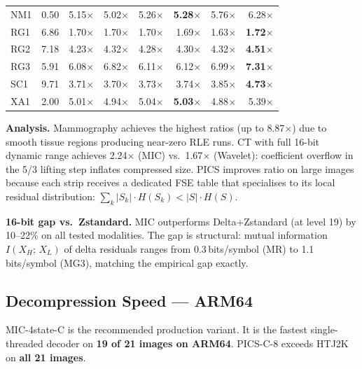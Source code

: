 \documentclass[journal]{IEEEtran}
\begin{document}
\begin{table}[t]
\begin{tabular}{lrrrrrrr}
NM1  & 0.50 & 5.15$\times$ & 5.02$\times$ & 5.26$\times$ & \textbf{5.28$\times$} & 5.76$\times$ & 6.28$\times$ \\
RG1  & 6.86 & 1.70$\times$ & 1.70$\times$ & 1.70$\times$ & 1.69$\times$ & 1.63$\times$ & \textbf{1.72$\times$} \\
RG2  & 7.18 & 4.23$\times$ & 4.32$\times$ & 4.28$\times$ & 4.30$\times$ & 4.32$\times$ & \textbf{4.51$\times$} \\
RG3  & 5.91 & 6.08$\times$ & 6.82$\times$ & 6.11$\times$ & 6.12$\times$ & 6.99$\times$ & \textbf{7.31$\times$} \\
SC1  & 9.71 & 3.71$\times$ & 3.70$\times$ & 3.73$\times$ & 3.74$\times$ & 3.85$\times$ & \textbf{4.73$\times$} \\
XA1  & 2.00 & 5.01$\times$ & 4.94$\times$ & 5.04$\times$ & \textbf{5.03$\times$} & 4.88$\times$ & 5.39$\times$ \\
\bottomrule
\end{tabular}
\end{table}

\textbf{Analysis.} Mammography achieves the highest ratios (up to 8.87$\times$)
due to smooth tissue regions producing near-zero RLE runs. CT with full 16-bit
dynamic range achieves 2.24$\times$ (MIC) vs.\ 1.67$\times$ (Wavelet): coefficient
overflow in the 5/3 lifting step inflates compressed size. PICS improves ratio on
large images because each strip receives a dedicated FSE table that specialises to
its local residual distribution:
$\sum_k |S_k| \cdot H(S_k) < |S| \cdot H(S)$.

\textbf{16-bit gap vs.\ Zstandard.} MIC outperforms Delta+Zstandard (at level
19) by 10--22\% on all tested modalities. The gap is structural: mutual
information $I(X_H;\, X_L)$ of delta residuals ranges from 0.3\,bits/symbol
(MR) to 1.1\,bits/symbol (MG3), matching the empirical gap exactly.

\subsection{Decompression Speed --- ARM64}

MIC-4state-C is the recommended production variant. It is the fastest
single-threaded decoder on \textbf{19 of 21 images on ARM64}. PICS-C-8 exceeds
HTJ2K on \textbf{all 21 images}.
\end{document}

